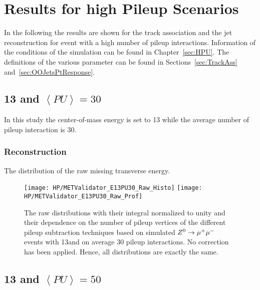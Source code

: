 \chapter{Results for high Pileup Scenarios \label{sec:HPUApp}}

In the following the results are shown for the track association and the jet reconstruction for event with a high number of pileup interactions. Information of the conditions of the simulation can be found in Chapter~\ref{sec:HPU}. The definitions of the various parameter can be found in Sections~\ref{sec:TrackAss} and~\ref{sec:OOJetsPtResponse}.

\section{\texorpdfstring{13\TeV{}}{13 TeV} and \texorpdfstring{$\left<PU\right>=30$}{<PU>=30}}

In this study the center-of-mass energy is set to 13\TeV{} while the average number of pileup interaction is 30. 

\subsection{\texorpdfstring{\MET{}}{MET} Reconstruction  \label{sec:HPUAppE13PU30MC}}

The distribution of the raw missing transverse energy. 

\begin{figure}[h!t]
  \centering
  \texttt{[image: HP/METValidator\_E13PU30\_Raw\_Histo]}
  \texttt{[image: HP/METValidator\_E13PU30\_Raw\_Prof]}
  \caption[The raw \MET{} distributions and their dependence on the number of pileup vertices for different pileup subtraction techniques based on simulated  $\Zz\rightarrow\MM$ events with 13\TeV and PU=30]{The raw \MET{} distributions with their integral normalized to unity and their dependence on the number of pileup vertices of the different pileup subtraction techniques based on simulated  $\Zz\rightarrow\MM$ events with 13\TeV and on average 30 pileup interactions. No correction has been applied. Hence, all distributions are exactly the same.}
\end{figure}

\section{\texorpdfstring{13\TeV{}}{13 TeV} and \texorpdfstring{$\left<PU\right>=50$}{<PU>=50}}

